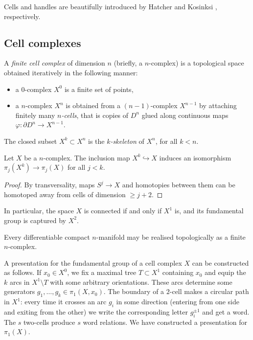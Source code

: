 Cells and handles are beautifully introduced by Hatcher \cite{HAT} and Kosinksi \cite{K}, respectively.

\subsection{Cell complexes}
A \emph{finite cell complex} of dimension $n$ (briefly, a $n$-complex) is a topological space obtained iteratively in the following manner:
\begin{itemize}
\item a $0$-complex $X^0$ is a finite set of points, 
\item a $n$-complex $X^n$ is obtained from a $(n-1)$-complex $X^{n-1}$ by attaching finitely many \emph{$n$-cells}, that is copies of $D^n$ glued along continuous maps $\varphi\colon \partial D^n \to X^{n-1}$.
\end{itemize}
The closed subset $X^k\subset X^n$ is the \emph{$k$-skeleton} of $X^n$, for all $k<n$.  

\begin{prop}
Let $X$ be a $n$-complex. The inclusion map $X^k \hookrightarrow X$ induces an isomorphism $\pi_{j}(X^k) \to \pi_j(X)$ for all $j<k$.
\end{prop}
\begin{proof}
By transversality, maps $S^j\to X$ and homotopies between them can be homotoped away from cells of dimension $\geqslant j+2$. 
\end{proof}

In particular, the space $X$ is connected if and only if $X^1$ is, and its fundamental group is captured by $X^2$.

\begin{teo} Every differentiable compact $n$-manifold may be realised topologically as a finite $n$-complex.
\end{teo}

A presentation for the fundamental group of a cell complex $X$ can be constructed as follows.
If $x_0\in X^0$, we fix a maximal tree $T\subset X^1$ containing $x_0$ and equip the $k$ arcs in $X^1\setminus T$ with some arbitrary orientations. These arcs determine some generators $g_1,\ldots, g_k\in\pi_1(X,x_0)$. The boundary of a $2$-cell makes a circular path in $X^1$: every time it crosses an arc $g_i$ in some direction (entering from one side and exiting from the other) we write the corresponding letter $g_i^{\pm 1}$ and get a word. The $s$ two-cells produce $s$ word relations. We have constructed a presentation for $\pi_1(X)$.

